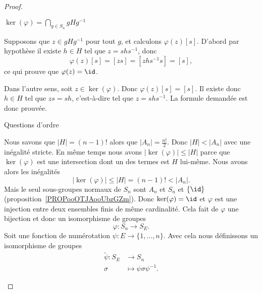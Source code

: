 \begin{proof}
\begin{subproof}
\begin{subproof}
                \item[\( \ker(\varphi)=\bigcap_{g\in S_n}gHg^{-1}\)]

                    Supposons que \( z\in gHg^{-1}\) pour tout \( g\), et calculons \( \varphi(z)[s]\). D'abord par hypothèse il existe \( h\in H\) tel que \( z=shs^{-1}\), donc
                    \begin{equation}
                        \varphi(z)[s]=[zs]=[zhs^{-1}s]=[s],
                    \end{equation}
                    ce qui prouve que \( \varphi(z)=\id\).

                    Dans l'autre sens, soit \( z\in\ker(\varphi)\). Donc \( \varphi(z)[s]=[s]\). Il existe donc \( h\in H\) tel que \( zs=sh\), c'est-à-dire tel que \( z=shs^{-1}\). La formule demandée est donc prouvée.

                \item[Questions d'ordre]

                    Nous savons que \( | H |=(n-1)!\) alors que \( | A_n |=\frac{ n! }{2}\). Donc \( | H |<| A_n |\) avec une inégalité stricte. En même temps nous avons \( | \ker(\varphi) |\leq | H |\) parce que \( \ker(\varphi)\) est une intersection dont un des termes est \( H\) lui-même. Nous avons alors les inégalités
                    \begin{equation}
                        | \ker(\varphi) |\leq | H |=(n-1)!<| A_n |.
                    \end{equation}
                    Mais le seul sous-groupes normaux de \( S_n\) sont \( A_n\) et \( S_n\) et \( \{ \id \}\) (proposition~\ref{PROPooOTJAooUbzGZm}). Donc \( \ker(\varphi)=\id\) et \( \varphi\) est une injection entre deux ensembles finis de même cardinalité. Cela fait de \( \varphi\) une bijection et donc un isomorphisme de groupes
                    \begin{equation}
                        \varphi\colon S_n\to S_E.
                    \end{equation}
                    Soit une fonction de numérotation \( \psi\colon E\to \{ 1,\ldots, n \}\). Avec cela nous définissons un isomorphisme de groupes
                    \begin{equation}
                        \begin{aligned}
                            \tilde \psi\colon S_E&\to S_n \\
                            \sigma&\mapsto \psi\sigma\psi^{-1}.
                        \end{aligned}
                    \end{equation}


\end{subproof}
\end{subproof}
\end{proof}
